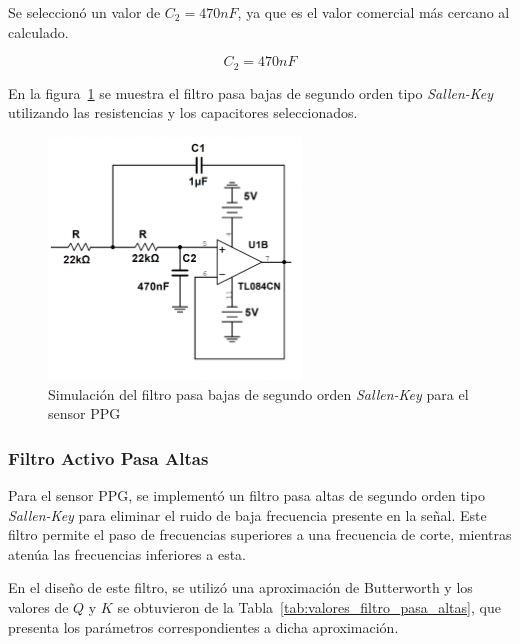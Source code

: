         Se seleccionó un valor de $C_2 = 470 nF$, ya que es el valor comercial más cercano al calculado.

        \begin{equation}
            C_2 = 470 nF
        \end{equation}

        En la figura~\ref{fig:Simulacion_Filtro_Pasa_Bajas_PPG} se muestra el filtro pasa bajas de segundo orden tipo \textit{Sallen-Key} utilizando las resistencias y los capacitores seleccionados.

        \begin{figure}[H]
            \centering
            \includegraphics[width=0.6\textwidth]{img/Desarrollo/multisim_pasaBajos_ppg.png}
            \caption[Simulación del filtro pasa bajas de segundo orden \textit{Sallen-Key} para el sensor PPG.]{Simulación del filtro pasa bajas de segundo orden \textit{Sallen-Key} para el sensor PPG\footnotemark}
            \label{fig:Simulacion_Filtro_Pasa_Bajas_PPG}
        \end{figure}

        \subsubsection{Filtro Activo Pasa Altas}
        Para el sensor PPG, se implementó un filtro pasa altas de segundo orden tipo \textit{Sallen-Key} para eliminar el ruido de baja frecuencia presente en la señal. Este filtro permite el paso de frecuencias superiores a una frecuencia de corte, mientras atenúa las frecuencias inferiores a esta.

        En el diseño de este filtro, se utilizó una aproximación de Butterworth y los valores de $Q$ y $K$ se obtuvieron de la Tabla~\ref{tab:valores_filtro_pasa_altas}, que presenta los parámetros correspondientes a dicha aproximación.


